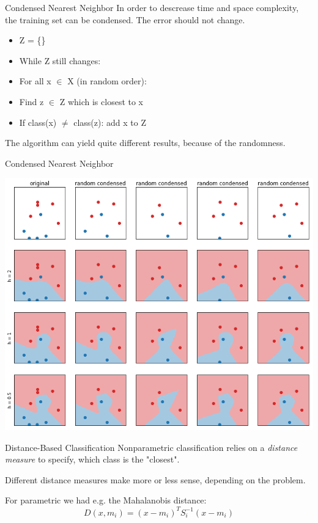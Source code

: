 \documentclass{beamer}
\begin{document}
\begin{frame}[fragile]{Condensed Nearest Neighbor}
In order to descrease time and space complexity, the training set can be condensed. The error should not change.

\footnotesize
\begin{itemize}\setlength\itemsep{0.1em}
  \item[] Z = \{\}
  \item[] While Z still changes:
  \item[] \hspace{0.5cm} For all x $\in$ X (in random order):
  \item[] \hspace{1cm} Find z $\in$ Z which is closest to x
  \item[] \hspace{1cm} If class(x) $\ne$ class(z): add x to Z
\end{itemize}

\normalsize
The algorithm can yield quite different results, because of the randomness.
\end{frame}

\begin{frame}[fragile]{Condensed Nearest Neighbor}
\begin{center}
  \includegraphics[height=0.9\textheight]{images/condensed_classification.png}
\end{center}
\end{frame}

\begin{frame}[fragile]{Distance-Based Classification}
Nonparametric classification relies on a \textit{distance measure} to specify, which class is the "closest".

Different distance measures make more or less sense, depending on the problem.

For parametric we had e.g. the Mahalanobis distance:
\begin{equation}
	D(x,m_i)=(x-m_i)^T S_i^{-1} (x-m_i)
\end{equation} 
\end{frame}
\end{document}
